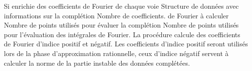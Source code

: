 %
%
%
%
%
%
%
%
{\fitem[So] Si enrichie des coefficients de Fourier de chaque voie}
{\fitem[Si] Structure de donn\'ees avec informations sur la compl\'etion}
{ Nombre de coefficients. de Fourier \`a calculer 
 Nombre de points utilis\'es pour \'evaluer la compl\'etion
 Nombre de points utilis\'es pour l'\'evaluation
des int\'egrales de Fourier.}
{La proc\'edure calcule des coefficients de Fourier d'indice positif et
n\'egatif. Les coefficients d'indice positif seront utilis\'es lors de la
phase d'approximation rationnelle, ceux d'indice n\'egatif servent \`a
calculer la norme de la partie instable des donn\'ees compl\'et\'ees.}
